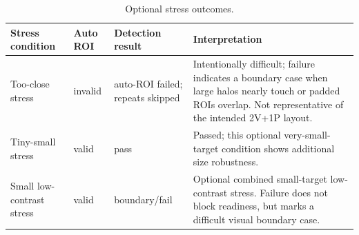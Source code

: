 \begin{table}[htbp]
\centering
\small
\begin{tabular}{p{}p{}p{}p{}}
\toprule
Stress condition & Auto ROI & Detection result & Interpretation \\
\midrule
Too-close stress & invalid & auto-ROI failed; repeats skipped & Intentionally difficult; failure indicates a boundary case when large halos nearly touch or padded ROIs overlap. Not representative of the intended 2V+1P layout. \\
Tiny-small stress & valid & pass & Passed; this optional very-small-target condition shows additional size robustness. \\
Small low-contrast stress & valid & boundary/fail & Optional combined small-target low-contrast stress. Failure does not block readiness, but marks a difficult visual boundary case. \\
\bottomrule
\end{tabular}
\caption{Optional stress outcomes.}
\label{tab:stress}
\end{table}